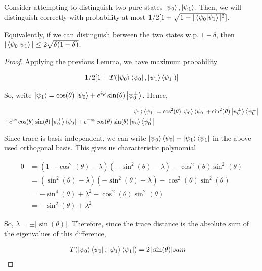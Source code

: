 \documentclass[main.tex]{subfiles}
\begin{document}
\begin{subappendices}
\begin{corollary}
\label{cor:distinguish-two-pure-states}
Consider attempting to distinguish two pure states $\ket{\psi_0}, \ket{\psi_1}$. Then, we will distinguish correctly with probability at most $1/2[1 + \sqrt{1 - |\bra{\psi_0}\ket{\psi_1}|^2}]$.

Equivalently, if we can distinguish between the two states w.p. $1 - \delta$, then $|\bra{\psi_0}\ket{\psi_1}| \leq 2\sqrt{\delta(1-\delta)}$. 	
\end{corollary}

\begin{proof}
Applying the previous Lemma, we have maximum probability

\begin{align*}
1/2[1 + T(\ket{\psi_0}\bra{\psi_0}, \ket{\psi_1}\bra{\psi_1}	)]
\end{align*}

So, write $\ket{\psi_1} = \cos(\theta) \ket{\psi_0} + e^{i\varphi}\sin(\theta)\ket{\psi_0^\perp}$. Hence,

\begin{align*}
\ket{\psi_1}\bra{\psi_1}	 &= \cos^2(\theta) \ket{\psi_0}\bra{\psi_0} + \sin^2(\theta)\ket{\psi_0^\perp}\bra{\psi_0^\perp}\\ 
+ e^{i\varphi}\cos(\theta)\sin(\theta)\ket{\psi_0^\perp}\bra{\psi_0} + e^{-i\varphi}\cos(\theta)\sin(\theta)\ket{\psi_0}\bra{\psi_0^\perp}
\end{align*}

Since trace is basis-independent, we can write $\ket{\psi_0}\bra{\psi_0} - \ket{\psi_1}\bra{\psi_1}$ in the above used orthogonal basis. This gives us characteristic polynomial

\begin{align*}
	0 &= (1-\cos^2(\theta) - \lambda)(-\sin^2(\theta) - \lambda) - \cos^2(\theta)\sin^2(\theta)\\
	&= (\sin^2(\theta) - \lambda)(-\sin^2(\theta) - \lambda) - \cos^2(\theta)\sin^2(\theta) \\
	&= -\sin^4(\theta) + \lambda^2 - \cos^2(\theta)\sin^2(\theta) \\
	&= -\sin^2(\theta) + \lambda^2
\end{align*}

 So, $\lambda = \pm |\sin(\theta)|$. Therefore, since the trace distance is the absolute sum of the eigenvalues of this difference, 

\begin{align*}
T(\ket{\psi_0}\bra{\psi_0}, \ket{\psi_1}\bra{\psi_1}	) &= 2|\sin(\theta)|sam
\end{align*}


\end{proof}
\end{subappendices}
\end{document}
